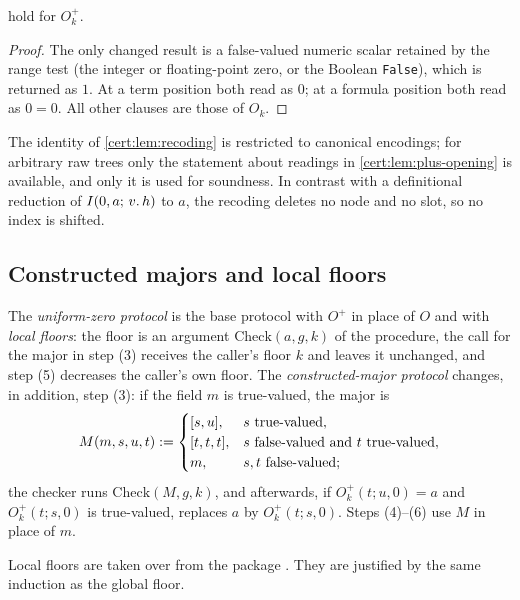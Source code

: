 \begin{lemma}\label{cert:lem:plus-opening}
 hold for $O^{+}_k$.
\end{lemma}
\begin{proof}
The only changed result is a false-valued numeric scalar retained by the range
test (the integer or floating-point zero, or the Boolean \texttt{False}),
which is returned as $1$. At a term position both read as $0$; at a formula
position both read as $0=0$. All other clauses are those of $O_k$.
\end{proof}

The identity of \cref{cert:lem:recoding} is restricted to canonical encodings;
for arbitrary raw trees only the statement about readings in
\cref{cert:lem:plus-opening} is available, and only it is used for soundness.
In contrast with a definitional reduction of $I(0,a;\,v.\,h)$ to $a$, the
recoding deletes no node and no slot, so no index is shifted.

\subsection{Constructed majors and local floors}

\begin{definition}\label{cert:def:uzero}
The \emph{uniform-zero protocol} is the base protocol with $O^{+}$ in place of
$O$ and with \emph{local floors}: the floor is an argument
$\mathrm{Check}(a,g,k)$ of the procedure, the call for the major in step (3)
receives the caller's floor $k$ and leaves it unchanged, and step (5)
decreases the caller's own floor. The \emph{constructed-major protocol}
changes, in addition, step (3): if the field $m$ is true-valued, the major is
\[
M(m,s,u,t)\mathrel{:=}
\begin{cases}
[s,u], & s\text{ true-valued},\\
[t,t,t], & s\text{ false-valued and }t\text{ true-valued},\\
m, & s,t\text{ false-valued};
\end{cases}
\]
the checker runs $\mathrm{Check}(M,g,k)$, and afterwards, if
$O^{+}_k(t;u,0)=a$ and $O^{+}_k(t;s,0)$ is true-valued, replaces $a$ by
$O^{+}_k(t;s,0)$. Steps (4)--(6) use $M$ in place of $m$.
\end{definition}

Local floors are taken over from the package . They are
justified by the same induction as the global floor.

